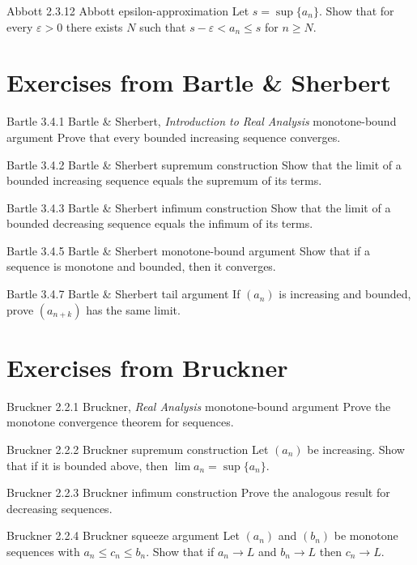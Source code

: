 \exstub
{Abbott 2.3.12}
{Abbott}
{epsilon-approximation}
{Let $s=\sup\{a_n\}$. Show that for every $\varepsilon>0$
there exists $N$ such that $s-\varepsilon < a_n \le s$ for $n\ge N$.}


\section*{Exercises from Bartle \& Sherbert}

\exstub
{Bartle 3.4.1}
{Bartle \& Sherbert, \textit{Introduction to Real Analysis}}
{monotone-bound argument}
{Prove that every bounded increasing sequence converges.}

\exstub
{Bartle 3.4.2}
{Bartle \& Sherbert}
{supremum construction}
{Show that the limit of a bounded increasing sequence
equals the supremum of its terms.}

\exstub
{Bartle 3.4.3}
{Bartle \& Sherbert}
{infimum construction}
{Show that the limit of a bounded decreasing sequence
equals the infimum of its terms.}

\exstub
{Bartle 3.4.5}
{Bartle \& Sherbert}
{monotone-bound argument}
{Show that if a sequence is monotone and bounded,
then it converges.}

\exstub
{Bartle 3.4.7}
{Bartle \& Sherbert}
{tail argument}
{If $(a_n)$ is increasing and bounded,
prove $(a_{n+k})$ has the same limit.}


\section*{Exercises from Bruckner}

\exstub
{Bruckner 2.2.1}
{Bruckner, \textit{Real Analysis}}
{monotone-bound argument}
{Prove the monotone convergence theorem for sequences.}

\exstub
{Bruckner 2.2.2}
{Bruckner}
{supremum construction}
{Let $(a_n)$ be increasing.
Show that if it is bounded above,
then $\lim a_n = \sup\{a_n\}$.}

\exstub
{Bruckner 2.2.3}
{Bruckner}
{infimum construction}
{Prove the analogous result for decreasing sequences.}

\exstub
{Bruckner 2.2.4}
{Bruckner}
{squeeze argument}
{Let $(a_n)$ and $(b_n)$ be monotone sequences with
$a_n \le c_n \le b_n$. Show that if
$a_n \to L$ and $b_n \to L$ then $c_n \to L$.}

